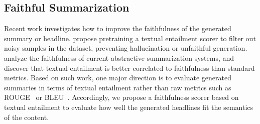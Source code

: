 \subsection{Faithful Summarization}
Recent work investigates how to improve the faithfulness of the generated
summary or headline. \citet{Matsumaru2020ImprovingTO} propose 
pretraining a textual entailment scorer to filter out noisy samples
in the dataset, preventing hallucination or unfaithful generation.
\citet{onfaith} analyze the faithfulness of current abstractive summarization
systems, and discover that textual entailment is better correlated
to faithfulness than standard metrics. Based on such work, one
major direction is to evaluate generated summaries in terms of textual entailment
rather than raw metrics such as ROUGE~\cite{lin-2004-rouge} or BLEU~\cite{bleu}.
Accordingly, we propose a faithfulness scorer based on textual entailment to
evaluate how well the generated headlines fit the semantics of the content. 
